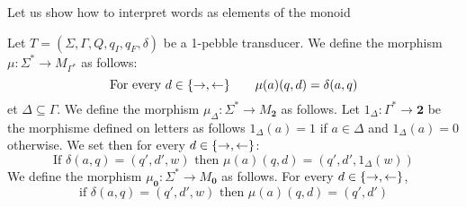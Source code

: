Let us show how to interpret words as elements of the monoid 
\begin{definition}
Let $T=(\Sigma, \Gamma, Q, q_I, q_F, \delta)$ be a 1-pebble transducer. 
We define the morphism $\mu:\Sigma^*\to M_{\Gamma^*}$ as follows:
$$\text{For every } d\in \{\rightarrow,\leftarrow\}\qquad\mu(a)(q,d)=\delta(a,q)$$
et $\Delta\subseteq \Gamma$. We define the morphism $\mu_\Delta:\Sigma^*\to M_{\mathbf 2}$ as follows. Let $1_\Delta:\Gamma^*\to \mathbf{2}$ be the morphisme defined on letters as follows $1_\Delta(a)=1$ if $a\in \Delta$ and $1_\Delta(a)=0$ otherwise. We set then for every $d\in\{\rightarrow,\leftarrow\}$: 
$$\text{If } \delta(a,q)=(q',d',w) \text{ then } \mu(a)(q,d)=(q',d',1_\Delta(w))$$
We define the morphism $\mu_{\mathbf{0}}:\Sigma^*\to M_{\mathbf 0}$ as follows. For every $d\in\{\rightarrow,\leftarrow\}$,
$$\text{if } \delta(a,q)=(q',d',w) \text{ then }  \mu(a)(q,d)=(q',d') $$
\end{definition} 

